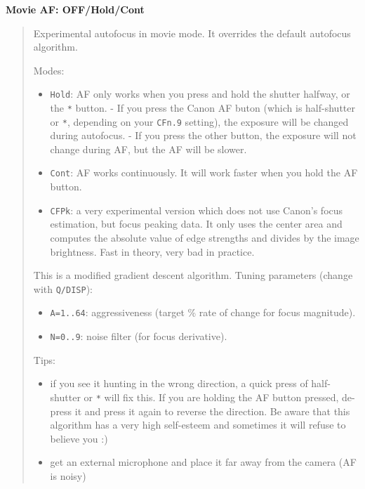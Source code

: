 \documentclass[a4paper,english]{article}
\begin{document}
\vspace{-10mm}\subsubsection*{}\label{custom-af-algorithm}
\textbf{Movie AF: OFF/Hold/Cont}
%
\begin{quote}

Experimental autofocus in movie mode. It overrides the default autofocus algorithm.

Modes:
%
\begin{itemize}

\item \texttt{Hold}: AF only works when you press and hold the shutter halfway, or the \texttt{*} button.
- If you press the Canon AF buton (which is half-shutter or \texttt{*}, depending on your \texttt{CFn.9} setting), the exposure will be changed during autofocus.
- If you press the other button, the exposure will not change during AF, but the AF will be slower.

\item \texttt{Cont}: AF works continuously. It will work faster when you hold the AF button.

\item \texttt{CFPk}: a very experimental version which does not use Canon's focus estimation, but focus peaking data. It only uses the center area and computes the absolute value of edge strengths and divides by the image brightness. Fast in theory, very bad in practice.

\end{itemize}

This is a modified gradient descent algorithm. Tuning parameters (change with \texttt{Q/DISP}):
%
\begin{itemize}

\item \texttt{A=1..64}: aggressiveness (target \% rate of change for focus magnitude).

\item \texttt{N=0..9}: noise filter (for focus derivative).

\end{itemize}

Tips:
%
\begin{itemize}

\item if you see it hunting in the wrong direction, a quick press of half-shutter or \texttt{*} will fix this. If you are holding the AF button pressed, de-press it and press it again to reverse the direction. Be aware that this algorithm has a very high self-esteem and sometimes it will refuse to believe you :)

\item get an external microphone and place it far away from the camera (AF is noisy)

\end{itemize}

\end{quote}
\end{document}
